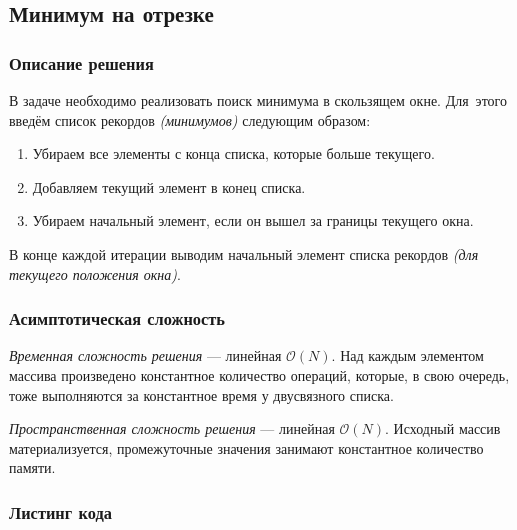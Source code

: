 \subsection{Минимум на отрезке}

\subsubsection{Описание решения}

В задаче необходимо реализовать поиск минимума в скользящем окне. Для~этого введём список рекордов \textit{(минимумов)} следующим образом:
\begin{enumerate}
  \item Убираем все элементы с конца списка, которые больше текущего.
  \item Добавляем текущий элемент в конец списка.
  \item Убираем начальный элемент, если он вышел за границы текущего окна. 
\end{enumerate}

В конце каждой итерации выводим начальный элемент списка рекордов \textit{(для текущего положения окна)}.

\subsubsection{Асимптотическая сложность}

\textit{Временная сложность решения} --- линейная \( \mathcal{O}(N) \). Над каждым элементом массива произведено константное количество операций, которые, в свою очередь, тоже выполняются за константное время у двусвязного списка.

\textit{Пространственная сложность решения} --- линейная \( \mathcal{O}(N) \). Исходный массив материализуется, промежуточные значения занимают константное количество памяти.

\subsubsection{Листинг кода}

